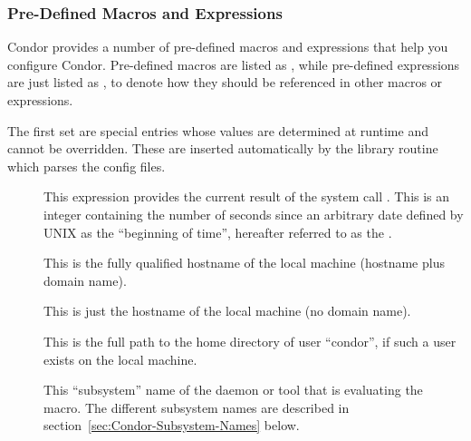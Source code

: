 \subsubsection{\label{sec:Pre-Defined-Macros-and-Expressions}
Pre-Defined Macros and Expressions}

Condor provides a number of pre-defined macros and expressions that
help you configure Condor.  Pre-defined macros are listed as
, while pre-defined expressions are just listed as
, to denote how they should be referenced in
other macros or expressions.

The first set are special entries whose values are determined at
runtime and cannot be overridden.  These are inserted automatically by
the library routine which parses the config files.
\begin{description}
  
\item[] \label{param:CurrentTime} This expression
  provides the current result of the system call .  This
  is an integer containing the number of seconds since an arbitrary
  date defined by UNIX as the ``beginning of time'', hereafter
  referred to as the .
  
\item[] \label{param:FullHostname} This is the
  fully qualified hostname of the local machine (hostname plus domain
  name).
  
\item[] \label{param:Hostname} This is just the
  hostname of the local machine (no domain name).
  
\item[] \label{param:Tilde} This is the full path to the
  home directory of user ``condor'', if such a user exists on the
  local machine.

\item[] \label{param:Subsystem} This ``subsystem''
  name of the daemon or tool that is evaluating the macro.  The
  different subsystem names are described in
  section~\ref{sec:Condor-Subsystem-Names} below.

\end{description}

